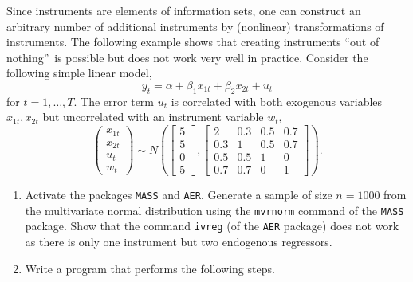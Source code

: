 \documentclass{article}
\begin{document}
Since instruments are elements of information sets, one can construct an
arbitrary number of additional instruments by (nonlinear) transformations of
instruments. The following example shows that creating instruments
\textquotedblleft out of nothing\textquotedblright\ is possible but does not
work very well in practice. Consider the following simple linear model,%
\begin{equation*}
y_{t}=\alpha +\beta _{1}x_{1t}+\beta _{2}x_{2t}+u_{t}
\end{equation*}%
for $t=1,\ldots ,T$. The error term $u_{t}$ is correlated with both
exogenous variables $x_{1t},x_{2t}$ but uncorrelated with an instrument
variable $w_{t} $,%
\begin{equation*}
\left(
\begin{array}{c}
x_{1t} \\
x_{2t} \\
u_{t} \\
w_{t}%
\end{array}%
\right) \sim N\left( \left[
\begin{array}{c}
5 \\
5 \\
0 \\
5%
\end{array}%
\right] ,\left[
\begin{array}{cccc}
2 & 0.3 & 0.5 & 0.7 \\
0.3 & 1 & 0.5 & 0.7 \\
0.5 & 0.5 & 1 & 0 \\
0.7 & 0.7 & 0 & 1%
\end{array}%
\right] \right) .
\end{equation*}

\begin{enumerate}
\item Activate the packages \texttt{MASS} and \texttt{AER}. Generate a
sample of size $n=1000$ from the multivariate normal distribution using the
\texttt{mvrnorm} command of the \texttt{MASS} package. Show that the command
\texttt{ivreg} (of the \texttt{AER} package) does not work as there is only
one instrument but two endogenous regressors.

\item Write a program that performs the following steps.
\end{enumerate}
\end{document}
